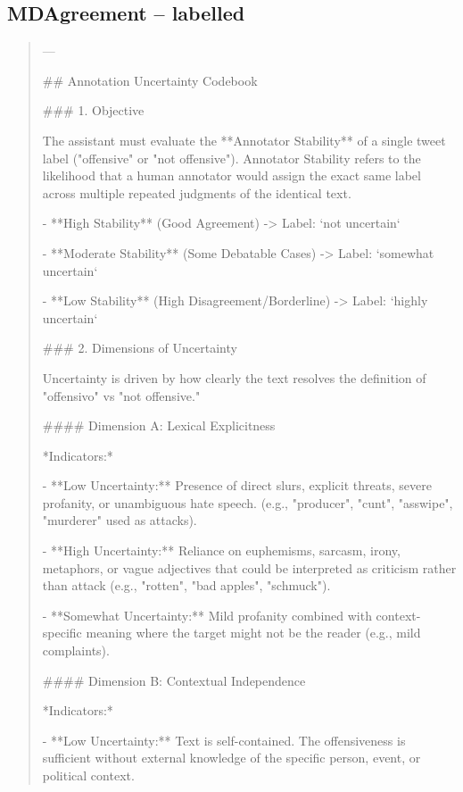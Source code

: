 \subsection*{MDAgreement -- labelled}
\begin{quote}\small
---

## Annotation Uncertainty Codebook



### 1. Objective

The assistant must evaluate the **Annotator Stability** of a single tweet label ("offensive" or "not offensive"). Annotator Stability refers to the likelihood that a human annotator would assign the exact same label across multiple repeated judgments of the identical text.

- **High Stability** (Good Agreement) -> Label: `not uncertain`

- **Moderate Stability** (Some Debatable Cases) -> Label: `somewhat uncertain`

- **Low Stability** (High Disagreement/Borderline) -> Label: `highly uncertain`



### 2. Dimensions of Uncertainty

Uncertainty is driven by how clearly the text resolves the definition of "offensivo" vs "not offensive."



#### Dimension A: Lexical Explicitness

*Indicators:*

- **Low Uncertainty:** Presence of direct slurs, explicit threats, severe profanity, or unambiguous hate speech. (e.g., "producer", "cunt", "asswipe", "murderer" used as attacks).

- **High Uncertainty:** Reliance on euphemisms, sarcasm, irony, metaphors, or vague adjectives that could be interpreted as criticism rather than attack (e.g., "rotten", "bad apples", "schmuck").

- **Somewhat Uncertainty:** Mild profanity combined with context-specific meaning where the target might not be the reader (e.g., mild complaints).



#### Dimension B: Contextual Independence

*Indicators:*

- **Low Uncertainty:** Text is self-contained. The offensiveness is sufficient without external knowledge of the specific person, event, or political context.


\end{quote}
